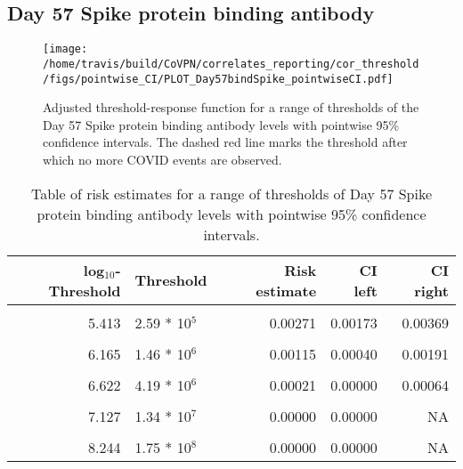 \documentclass[]{book}
\theoremstyle{definition}
\theoremstyle{definition}
\theoremstyle{definition}
\newcommand{\1}{\mathbbm{1}}
\begin{document}
\clearpage

\hypertarget{day-57-spike-protein-binding-antibody}{%
\subsection{Day 57 Spike protein binding antibody}\label{day-57-spike-protein-binding-antibody}}

\begin{figure}[H]
\centering
\texttt{[image: /home/travis/build/CoVPN/correlates\_reporting/cor\_threshold/figs/pointwise\_CI/PLOT\_Day57bindSpike\_pointwiseCI.pdf]}
\caption{Adjusted threshold-response function for a range of thresholds of the
  Day 57 Spike protein binding antibody levels with pointwise 95\% confidence intervals. The dashed red line marks the threshold after which no more COVID events are observed. }
\end{figure}
\begin{table}[!h]

\caption{\label{tab:unnamed-chunk-347}Table of risk estimates for a range of thresholds of Day 57 Spike protein binding antibody levels with pointwise 95\% confidence intervals.}
\centering
\begin{tabular}[t]{rlrrr}
\toprule
log$_{10}$-Threshold & Threshold & Risk estimate & CI left & CI right\\
\midrule
\cellcolor{gray!6}{4.536} & \cellcolor{gray!6}{3.44 * 10$^4$} & \cellcolor{gray!6}{0.00480} & \cellcolor{gray!6}{0.00353} & \cellcolor{gray!6}{0.00608}\\
5.413 & 2.59 * 10$^5$ & 0.00271 & 0.00173 & 0.00369\\
\cellcolor{gray!6}{5.797} & \cellcolor{gray!6}{6.27 * 10$^5$} & \cellcolor{gray!6}{0.00172} & \cellcolor{gray!6}{0.00090} & \cellcolor{gray!6}{0.00255}\\
6.165 & 1.46 * 10$^6$ & 0.00115 & 0.00040 & 0.00191\\
\cellcolor{gray!6}{6.405} & \cellcolor{gray!6}{2.54 * 10$^6$} & \cellcolor{gray!6}{0.00079} & \cellcolor{gray!6}{0.00008} & \cellcolor{gray!6}{0.00150}\\
6.622 & 4.19 * 10$^6$ & 0.00021 & 0.00000 & 0.00064\\
\cellcolor{gray!6}{6.820} & \cellcolor{gray!6}{6.61 * 10$^6$} & \cellcolor{gray!6}{0.00028} & \cellcolor{gray!6}{0.00000} & \cellcolor{gray!6}{0.00087}\\
7.127 & 1.34 * 10$^7$ & 0.00000 & 0.00000 & NA\\
\cellcolor{gray!6}{7.409} & \cellcolor{gray!6}{2.56 * 10$^7$} & \cellcolor{gray!6}{0.00000} & \cellcolor{gray!6}{0.00000} & \cellcolor{gray!6}{NA}\\
8.244 & 1.75 * 10$^8$ & 0.00000 & 0.00000 & NA\\
\bottomrule
\end{tabular}
\end{table}
\end{document}
